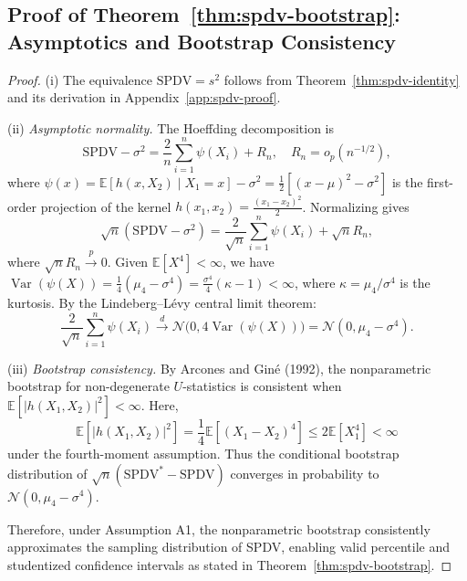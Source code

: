 \documentclass[12pt,a4paper]{article}
\begin{document}
\subsection{Proof of Theorem~\ref{thm:spdv-bootstrap}: Asymptotics and Bootstrap Consistency}
\label{app:proof-bootstrap}
\begin{proof}

(i) The equivalence $\text{SPDV} = s^2$ follows from Theorem~\ref{thm:spdv-identity} and its derivation in Appendix~\ref{app:spdv-proof}.

\noindent (ii) \textit{Asymptotic normality.} The Hoeffding decomposition is
\begin{equation}
    \text{SPDV}-\sigma^2 = \frac{2}{n}\sum_{i=1}^n\psi(X_i)+R_n, \quad R_n = o_p(n^{-1/2}),
\end{equation}
where $\psi(x) = \mathbb{E}[h(x,X_2) \mid X_1=x] - \sigma^2 = \frac{1}{2}[(x-\mu)^2 - \sigma^2]$ is the first-order projection of the kernel $h(x_1,x_2) = \frac{(x_1-x_2)^2}{2}$. Normalizing gives
\begin{equation}
    \sqrt{n}(\text{SPDV}-\sigma^2) = \frac{2}{\sqrt{n}}\sum_{i=1}^n\psi(X_i) + \sqrt{n}R_n,
\end{equation}
where $\sqrt{n}R_n \xrightarrow{p} 0$. Given $\mathbb{E}[X^4] < \infty$, we have $\operatorname{Var}(\psi(X)) = \frac{1}{4}(\mu_4 - \sigma^4) = \frac{\sigma^4}{4}(\kappa-1) < \infty$, where $\kappa = \mu_4/\sigma^4$ is the kurtosis. By the Lindeberg--Lévy central limit theorem:
\begin{equation}
    \frac{2}{\sqrt{n}}\sum_{i=1}^n\psi(X_i) \xrightarrow{d} \mathcal{N}\bigl(0, 4\operatorname{Var}(\psi(X))\bigr) = \mathcal{N}(0, \mu_4 - \sigma^4).
\end{equation}

\noindent (iii) \textit{Bootstrap consistency.} By Arcones and Giné (1992), the nonparametric bootstrap for non-degenerate $U$-statistics is consistent when $\mathbb{E}[|h(X_1,X_2)|^2] < \infty$. Here,
\[
\mathbb{E}[|h(X_1,X_2)|^2] = \frac{1}{4}\mathbb{E}[(X_1 - X_2)^4] \le 2\mathbb{E}[X_1^4] < \infty
\]
under the fourth-moment assumption. Thus the conditional bootstrap distribution of $\sqrt{n}(\text{SPDV}^* - \text{SPDV})$ converges in probability to $\mathcal{N}(0, \mu_4 - \sigma^4)$.

Therefore, under Assumption A1, the nonparametric bootstrap consistently approximates the sampling distribution of SPDV, enabling valid percentile and studentized confidence intervals as stated in Theorem~\ref{thm:spdv-bootstrap}.
\end{proof}
\end{document}
